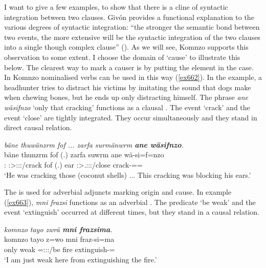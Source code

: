 I want to give a few examples, to show that there is a cline of syntactic integration between two clauses. Givón provides a functional explanation to the various degrees of syntactic integration: ``the stronger the semantic bond between two events, the more extensive will be the syntactic integration of the two clauses into a single though complex clause'' (\citeyear[41]{Givon:2001syntax}). As we will see, Komnzo supports this observation to some extent. I choose the domain of `cause' to illustrate this below. The clearest way to mark a causer is by putting the element in the  case. In Komnzo nominalised verbs can be used in this way (\ref{ex662}). In the example, a  headhunter tries to distract his victims by imitating the sound that dogs make when chewing bones, but he ends up only distracting himself. The phrase \emph{ane wäsifnzo} `only that cracking' functions as a clausal . The event `crack' and the event `close' are tightly integrated. They occur simultaneously and they stand in direct causal relation.

\begin{exe}
	\ex \emph{bäne thuwänzrm fof ... zarfa surmänwrm \textbf{ane wäsifnzo}.}\\
	\gll bäne thunzrm fof (.) zarfa suwrm ane wä-si=f=nzo\\
	\Dem:\Med{} \Stsg:\Sbj>\Stpl:\Obj:\Pst:\Dur/crack fof (.) ear \Stsg:\Sbj>\Tsg.\Masc:\Obj:\Pst:\Dur/close \Dem{} crack-\Nmlz=\Erg=\Only\\
	\trans `He was cracking those (coconut shells) ... This cracking was blocking his ears.'
	\label{ex662}
\end{exe}

The   is used for adverbial adjuncts marking origin and cause. In example (\ref{ex663}), \emph{mni frazsi} functions as an adverbial . The predicate `be weak' and the event `extinguish' occurred at different times, but they stand in a causal relation.

\begin{exe}
	\ex \emph{komnzo tayo zwrä \textbf{mni frazsima}.}\\
	\gll komnzo tayo z=wo mni fraz-si=ma\\
	only weak \Prox=\Fsg:\Sbj:\Nonpast:\Ipfv/be fire extinguish-\Nmlz=\Char{}\\
	\trans `I am just weak here from extinguishing the fire.'
	\label{ex663}
\end{exe}

